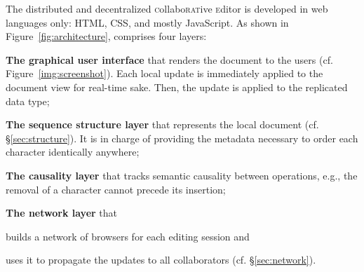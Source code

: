 The distributed and decentralized \textsc{c}ollabo\textsc{rat}ive
\textsc{e}ditor \CRATE is developed in web languages only: HTML, CSS, and mostly
JavaScript. As shown in Figure~\ref{fig:architecture}, \CRATE comprises four
layers:
\begin{asparadesc}
\item [\textbf{The graphical user interface}] that renders the document to the users
  (cf. Figure~\ref{img:screenshot}). Each local update is immediately applied to
  the document view for real-time sake. Then, the update is applied to the
  replicated data type;
\item [\textbf{The sequence structure layer}] that represents the local document
  (cf. §\ref{sec:structure}). It is in charge of providing the metadata
  necessary to order each character identically anywhere;
\item [\textbf{The causality layer}] that tracks semantic causality between operations,
  e.g., the removal of a character cannot precede its insertion;
\item [\textbf{The network layer}] that
  \begin{inparaenum}[(i)]
  \item builds a network of browsers for each editing session and
  \item uses it to propagate the updates to all collaborators
    (cf. §\ref{sec:network}).
  \end{inparaenum}
\end{asparadesc}



